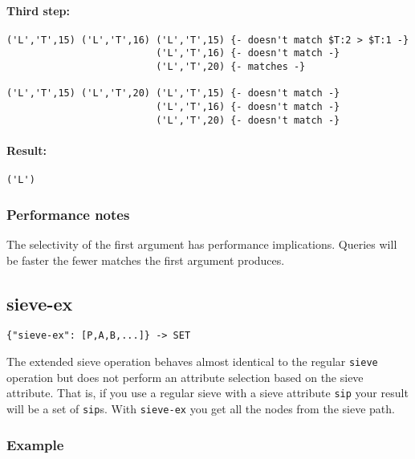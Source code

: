 \documentclass[a4paper]{article}
\begin{document}
\paragraph*{Third step:}

\begin{verbatim}
('L','T',15) ('L','T',16) ('L','T',15) {- doesn't match $T:2 > $T:1 -}
                          ('L','T',16) {- doesn't match -}
                          ('L','T',20) {- matches -}

('L','T',15) ('L','T',20) ('L','T',15) {- doesn't match -}
                          ('L','T',16) {- doesn't match -}
                          ('L','T',20) {- doesn't match -}                      
\end{verbatim}


\paragraph*{Result: }

\begin{verbatim}
('L')
\end{verbatim}

\subsubsection{Performance notes}

The selectivity of the first argument has performance
implications. Queries will be faster the fewer matches the first
argument produces. 

\subsection{sieve-ex}

\begin{verbatim}
{"sieve-ex": [P,A,B,...]} -> SET
\end{verbatim}

The extended sieve operation behaves almost identical to the regular \verb|sieve| operation but does not perform an attribute selection based on the sieve attribute.
That is, if you use a regular sieve with a sieve attribute \verb|sip| your result will be a set of \verb|sip|s. With \verb|sieve-ex| you get all the nodes from the sieve
path. 

\subsubsection{Example}
\end{document}
